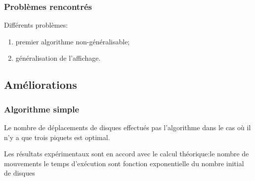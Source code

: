 \documentclass{beamer}%
\begin{document}
			\begin{frame}
				\frametitle{Problèmes rencontrés}
				Différents problèmes:
				\begin{enumerate}
					\item premier algorithme non-généralisable;
					\item généralisation de l'affichage.
				\end{enumerate}
			\end{frame}
			
		\subsection{Améliorations}
			\begin{frame}
				\frametitle{Algorithme simple}
				Le nombre de déplacements de disques effectués pas l'algorithme
				dans le cas où il n'y a que trois piquets est optimal.
				
				\begin{figure}
					\centering
					\qquad
				\end{figure}
				
				Les résultats expérimentaux sont en accord avec
				le calcul théorique:le nombre de mouvements
				le temps d'exécution sont fonction exponentielle du nombre
				initial de disques
			\end{frame}
			
\end{document}
